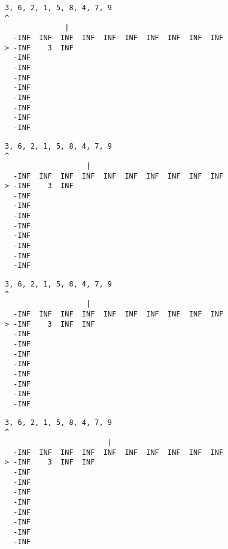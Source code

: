 { \begin{verbatim}
3, 6, 2, 1, 5, 8, 4, 7, 9
^
              |
  -INF  INF  INF  INF  INF  INF  INF  INF  INF  INF
> -INF    3  INF                                   
  -INF                                             
  -INF                                             
  -INF                                             
  -INF                                             
  -INF                                             
  -INF                                             
  -INF                                             
  -INF                                             
\end{verbatim} }

{ \begin{verbatim}
3, 6, 2, 1, 5, 8, 4, 7, 9
^
                   |
  -INF  INF  INF  INF  INF  INF  INF  INF  INF  INF
> -INF    3  INF                                   
  -INF                                             
  -INF                                             
  -INF                                             
  -INF                                             
  -INF                                             
  -INF                                             
  -INF                                             
  -INF                                             
\end{verbatim} }

{ \begin{verbatim}
3, 6, 2, 1, 5, 8, 4, 7, 9
^
                   |
  -INF  INF  INF  INF  INF  INF  INF  INF  INF  INF
> -INF    3  INF  INF                              
  -INF                                             
  -INF                                             
  -INF                                             
  -INF                                             
  -INF                                             
  -INF                                             
  -INF                                             
  -INF                                             
\end{verbatim} }

{ \begin{verbatim}
3, 6, 2, 1, 5, 8, 4, 7, 9
^
                        |
  -INF  INF  INF  INF  INF  INF  INF  INF  INF  INF
> -INF    3  INF  INF                              
  -INF                                             
  -INF                                             
  -INF                                             
  -INF                                             
  -INF                                             
  -INF                                             
  -INF                                             
  -INF                                             
\end{verbatim} }

